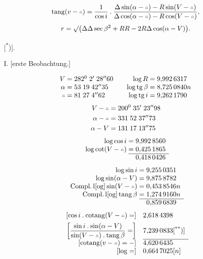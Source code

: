 \[
\operatorname{tang}(v-\AstNode)=\frac1{\cos i}\mathbin{.}\frac{\Delta\sin(\alpha-\AstNode)-R\sin(V-\AstNode)}{\Delta\cos(\alpha-\AstNode)-R\cos(V-\AstNode)},
\]
\[
r=\surd\bigl(\Delta\Delta\sec\beta^2+RR-2R\Delta\cos(\alpha-V)\bigr).
\]
\clearpage
{}
\begin{center}
[\textsuperscript{*})].\par\medskip
I. [erste Beobachtung.]
\end{center}
\noindent{\small [S. 6]}\par
\begingroup\renewcommand{\thefootnote}{}\endgroup
\[
\begin{array}{r@{\;}c@{\;}l@{\qquad}r@{\;}c@{\;}l}
V&=&282^0\;2'\;28''60&\log R&=&9{,}992\,6317\\
\alpha&=&53\;19\;42''35&\log\operatorname{tg}\beta&=&8{,}725\,0840n\\
\AstNode&=&81\;27\;4''62&\log\operatorname{tg}i&=&9{,}262\,1790
\end{array}
\]
\[
\begin{aligned}
V-\AstNode&=200^0\;35'\;23''98\\
\alpha-\AstNode&=331\;52\;37''73\\
\alpha-V&=131\;17\;13''75
\end{aligned}
\]
\[
\begin{array}{r@{\;}c@{\;}l}
\log\cos i&=&9{,}992\,8560\\
\log\operatorname{cot}(V-\AstNode)&=&0{,}425\,1865\\\cline{2-3}
&&0{,}418\,0426
\end{array}
\]
\[
\begin{array}{r@{\;}c@{\;}l}
\log\sin i&=&9{,}255\,0351\\
\log\sin(\alpha-V)&=&9{,}875\,8782\\
\mathrm{Compl.}\,\mathrm{l[og]}\sin(V-\AstNode)&=&0{,}453\,8546n\\
\mathrm{Compl.}\,\mathrm{l[og]}\operatorname{tang}\beta&=&1{,}274\,9160n\\\cline{2-3}
&&0{,}859\,6839
\end{array}
\]
\[
\begin{array}{r@{\quad}l}
{}[\cos i\mathbin{.}\operatorname{cotang}(V-\AstNode)=]&2{,}618\,4398\\[1ex]
\left[\dfrac{\sin i\mathbin{.}\sin(\alpha-V)}{\sin(V-\AstNode)\mathbin{.}\operatorname{tang}\beta}=\right]&7{,}239\,0833\text{[\textsuperscript{**})]}\\\cline{2-2}
{}[\operatorname{cotang}(v-\AstNode)=-]&4{,}620\,6435\\
{}[\log=]&0{,}664\,7025[n]
\end{array}
\]
